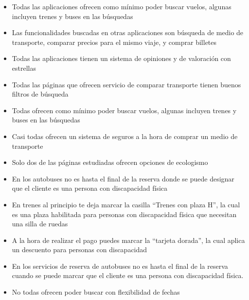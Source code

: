 \begin{itemize}
    \item Todas las aplicaciones ofrecen como mínimo poder buscar vuelos, algunas incluyen trenes y buses en las búsquedas
    \item Las funcionalidades buscadas en otras aplicaciones son búsqueda de medio de transporte, comparar precios para el mismo viaje, y comprar billetes
    \item Todas las aplicaciones tienen un sistema de opiniones y de valoración con estrellas
    \item Todas las páginas que ofrecen servicio de comparar transporte tienen buenos filtros de búsqueda
    \item Todas ofrecen como mínimo poder buscar vuelos, algunas incluyen trenes y buses en las búsquedas
    \item Casi todas ofrecen un sistema de seguros a la hora de comprar un medio de transporte
    \item Solo dos de las páginas estudiadas ofrecen opciones de ecologismo
    \item En los autobuses no es hasta el final de la reserva donde se puede designar que el cliente es una persona con discapacidad física
    \item En trenes al principio te deja marcar la casilla “Trenes con plaza H”, la cual es una plaza habilitada para personas con discapacidad física que necesitan una silla de ruedas 
    \item A la hora de realizar el pago puedes marcar la “tarjeta dorada”, la cual aplica un descuento para personas con discapacidad
    \item En los servicios de reserva de autobuses no es hasta el final de la reserva cuando se puede marcar que el cliente es una persona con discapacidad física.
    \item No todas ofrecen poder buscar con flexibilidad de fechas

\end{itemize}
